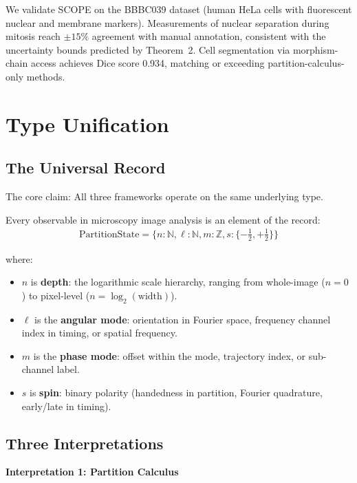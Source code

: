 \documentclass[11pt,twocolumn]{article}
\begin{document}
We validate SCOPE on the BBBC039 dataset (human HeLa cells with fluorescent nuclear and membrane markers). Measurements of nuclear separation during mitosis reach $\pm 15\%$ agreement with manual annotation, consistent with the uncertainty bounds predicted by Theorem~2. Cell segmentation via morphism-chain access achieves Dice score 0.934, matching or exceeding partition-calculus-only methods.

\section{Type Unification}
\label{sec:types}

\subsection{The Universal Record}

The core claim: All three frameworks operate on the same underlying type.

\begin{definition}
Every observable in microscopy image analysis is an element of the record:
\begin{align}
\text{PartitionState} = \{n : \mathbb{N}, \ell : \mathbb{N}, m : \mathbb{Z}, s : \{-\frac{1}{2}, +\frac{1}{2}\}\}
\end{align}

\noindent where:
\begin{itemize}
\item $n$ is \textbf{depth}: the logarithmic scale hierarchy, ranging from whole-image ($n=0$) to pixel-level ($n = \log_2(\text{width})$).
\item $\ell$ is the \textbf{angular mode}: orientation in Fourier space, frequency channel index in timing, or spatial frequency.
\item $m$ is the \textbf{phase mode}: offset within the mode, trajectory index, or sub-channel label.
\item $s$ is \textbf{spin}: binary polarity (handedness in partition, Fourier quadrature, early/late in timing).
\end{itemize}
\end{definition}

\subsection{Three Interpretations}

\textbf{Interpretation 1: Partition Calculus}
\end{document}
